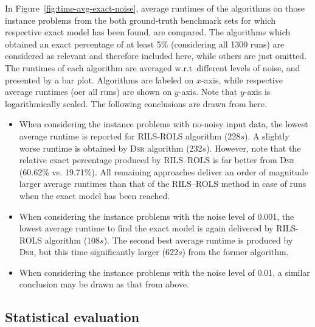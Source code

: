 \documentclass{bmcart}
\begin{document}
In Figure~\ref{fig:time-avg-exact-noise}, average runtimes of the algorithms on those instance problems from the both ground-truth benchmark sets for which respective exact model has  been found, are compared. The algorithms which obtained an exact percentage of at least 5\% (considering all 1300 runs) are considered as relevant  and therefore included here, while others are just omitted.  The runtimes of each algorithm  are averaged w.r.t\  different levels of noise, and presented by a bar plot. Algorithms are labeled on $x$-axis, while respective average runtimes (oer all runs) are shown on $y$-axis. Note that $y$-axis is logarithmically scaled. The following conclusions are drawn from here.

\begin{itemize}
	\item When considering the instance problems with no-noisy input data, the lowest average runtime  is reported for \textsc{RILS}-\textsc{ROLS} algorithm (228$s$). A slightly worse runtime is obtained by \textsc{Dsr} algorithm (232$s$).  However, note that the relative exact percentage produced by \textsc{RILS}--\textsc{ROLS} is far better from \textsc{Dsr} (60.62\% vs. 19.71\%). 	All remaining approaches deliver an order of magnitude larger average runtimes than that of the \textsc{RILS}--\textsc{ROLS} method in case of runs when the exact model has been reached.   
	\item  When considering the instance problems with the noise level of 0.001,    the lowest average runtime  to find the exact model is again delivered by \textsc{RILS}-\textsc{ROLS} algorithm (108$s$). The second best average runtime is produced by \textsc{Dsr}, but this time significantly larger (622$s$) from the former algorithm. 
	\item When considering the instance problems with the noise level of 0.01, a similar conclusion may be drawn as that from above. 
\end{itemize}


\subsection{Statistical evaluation}
\end{document}
